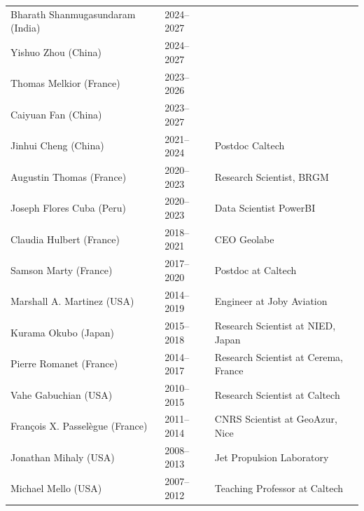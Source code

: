 \documentclass[10pt]{article}
\begin{document}
\begin{table}[h!]
\begin{tabular}{L{6cm}L{2cm}D{7cm}}
\color{groy}Bharath Shanmugasundaram (India)    & 2024–2027&   \\
\color{groy}Yishuo Zhou (China)           		& 2024–2027&   \\
\color{groy}Thomas Melkior (France)       		& 2023–2026&   \\
\color{groy}Caiyuan Fan (China)          		& 2023–2027&   \\
\color{black}Jinhui Cheng (China)         		& 2021–2024&   Postdoc Caltech\\
\color{black}Augustin Thomas (France)      		& 2020–2023&   Research Scientist, BRGM \\
\color{black}Joseph Flores Cuba (Peru)   		& 2020–2023&   Data Scientist PowerBI\\
\color{black}Claudia Hulbert (France)   	  		& 2018–2021&  CEO Geolabe\\
\color{black}Samson Marty (France)    	      	& 2017–2020&  Postdoc at Caltech\\
\color{black}Marshall A. Martinez (USA)  		& 2014–2019&  Engineer at Joby Aviation \\
\color{black}Kurama Okubo (Japan)   	      		& 2015–2018&  Research Scientist at NIED, Japan\\
\color{black}Pierre Romanet (France)        		& 2014–2017&  Research Scientist at Cerema, France\\
\color{black}Vahe Gabuchian (USA)       			& 2010–2015&  Research Scientist at Caltech\\
\color{black}François X. Passelègue (France)		& 2011–2014&  CNRS Scientist at GeoAzur, Nice\\
\color{black}Jonathan Mihaly (USA)        		& 2008–2013&  Jet Propulsion Laboratory\\
\color{black}Michael Mello (USA)          		& 2007–2012&  Teaching Professor at Caltech\\[16pt]
\end{tabular}



\end{table}
\end{document}
